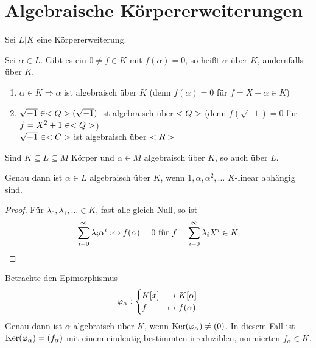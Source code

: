 \section{Algebraische Körpererweiterungen}

Sei $L \vert K$ eine Körpererweiterung.

\begin{definition}
	Sei $\alpha \in L$. Gibt es ein $0 \neq f \in K$ mit $f(\alpha) = 0$, so heißt $\alpha$  über $K$, andernfalls  über $K$.
\end{definition}

\begin{example}
	\begin{enumerate}[label=(\alph*)]
		\item $\alpha \in K \Rightarrow \alpha$ ist algebraisch über $K$ (denn $f(\alpha) = 0$ für $f = X - \alpha \in K$)
		\item $\sqrt{-1} \in \Q(\sqrt{-1})$ ist algebraisch über $\Q$ (denn $f(\sqrt{-1})=0$ für $f = X^2 + 1 \in \Q$) \\
		$\sqrt{-1} \in \C$ ist algebraisch über $\R$        
	\end{enumerate}
\end{example}

\begin{remark}
	Sind $K \subseteq L \subseteq M$ Körper und $\alpha \in M$ algebraisch über $K$, so auch über $L$.
\end{remark}

\begin{lemma} 
	Genau dann ist $\alpha \in L$ algebraisch über $K$, wenn $1, \alpha, \alpha^2 , \dots$ $K$-linear abhängig sind.
\end{lemma}

\begin{proof}
	Für $\lambda_0 , \lambda_1 , \dots \in K$, fast alle gleich Null, so ist
	\begin{align}
	\sum_{i=0}^\infty \lambda_i \alpha^i :\Leftrightarrow f(\alpha) = 0 \text{ für } f = \sum_{i=0}^\infty \lambda_i X^i \in K\notag
	\end{align}
\end{proof}

\begin{lemma}
	Betrachte den Epimorphismus
	\begin{align}
	\phi_{\alpha}:\begin{cases}
	K[x] &\to K[\alpha]\\
	f &\mapsto f(\alpha).
	\end{cases}\notag
	\end{align}
	Genau dann ist $\alpha$ algebraisch über $K$, wenn $\Ker(\phi_\alpha) \neq (0)$. In diesem Fall ist $\Ker(\phi_\alpha) = (f_\alpha)$ mit einem eindeutig bestimmten irreduziblen, normierten $f_\alpha \in K$.
\end{lemma}

